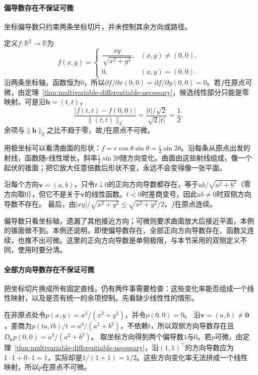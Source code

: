 \paragraph{偏导数存在不保证可微}
坐标偏导数只约束两条坐标切片，并未控制其余方向或路径。
\begin{example}[偏导数存在但不可微]
\label{ex:analysis-partials-not-differentiable}
定义$f:\mathbb{R}^2\to\mathbb{R}$为
\[
 f(x,y)=
 \begin{cases}
  \dfrac{xy}{\sqrt{x^2+y^2}}, & (x,y)\neq(0,0),\\[6pt]
  0, & (x,y)=(0,0).
 \end{cases}
\]
沿两条坐标轴，函数恒为$0$，所以$\partial f/\partial x(0,0)=\partial f/\partial y(0,0)=0$。若$f$在原点可微，由定理~\ref{thm:multivariable-differentiable-necessary}，候选线性部分只能是零映射。可是沿$\bm{h}=(t,t)$，
\[
 \frac{|f(t,t)-f(0,0)|}{\lVert(t,t)\rVert_2}
 =\frac{|t|/\sqrt{2}}{\sqrt{2}|t|}
 =\frac12,
\]
余项与$\lVert\bm{h}\rVert_2$之比不趋于零，故$f$在原点不可微。

用极坐标可以看清曲面的形状：$f=r\cos\theta\sin\theta=\tfrac r2\sin2\theta$。沿每条从原点出发的射线，函数随$r$线性增长，斜率$\tfrac12\sin2\theta$随方向变化。曲面由这些射线组成，像一个起伏的锥面；把它放大任意倍数后形状不变，永远不会变得像一张平面。

沿每个方向$\bm v=(a,b)$，只令$t\downarrow0$的正向方向导数都存在，等于$ab/\sqrt{a^2+b^2}$（零方向取$0$），但它不是关于$\bm v$的线性函数。$t<0$时差商变号，因此$ab\neq0$时双侧方向导数不存在。
最后，由$|xy|/\sqrt{x^2+y^2}\leq\sqrt{x^2+y^2}/2$，$f$在原点连续。
\end{example}

偏导数只看坐标轴，遗漏了其他接近方向；可微则要求曲面放大后接近平面，本例的锥面做不到。本例还说明，即使偏导数存在、全部正向方向导数存在、函数又连续，也推不出可微。这里的正向方向导数是单侧极限，与本节采用的双侧定义不同，使用时要分清。

\paragraph{全部方向导数存在不保证可微}
把坐标切片换成所有固定直线，仍有两件事需要检查：这些变化率能否组成一个线性映射，以及是否有统一的余项控制。先看缺少线性性的情形。
\begin{example}[方向导数不构成线性映射]
\label{ex:multivariable-nonlinear-directional-derivatives}
在非原点处令$p(x,y)=x^3/(x^2+y^2)$，并令$p(0,0)=0$。
沿$\bm v=(a,b)\neq\bm0$，差商为$p(ta,tb)/t=a^3/(a^2+b^2)$，不依赖$t$，所以双侧方向导数存在且$D_{\bm v}p(0,0)=a^3/(a^2+b^2)$。
取坐标方向得到两个偏导数$1$与$0$。若$p$可微，由定理~\ref{thm:multivariable-differentiable-necessary}，沿$(1,1)^\top$的方向导数应为$1\cdot1+0\cdot1=1$，实际却是$1/(1+1)=1/2$。这些方向变化率无法拼成一个线性映射，所以$p$在原点不可微。
\end{example}


